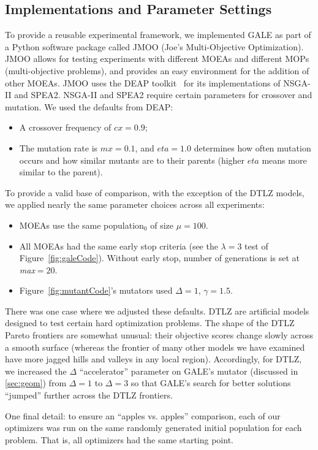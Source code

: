 \documentclass[10pt,journal,compsoc]{IEEEtran}
\newcommand{\bi}{\begin{itemize}}
\newcommand{\ei}{\end{itemize}}
\newcommand{\tion}[1]{\textsection\ref{sec:#1}}
\newcommand{\fig}[1]{Figure~\ref{fig:#1}}
\newenvironment{changed}{\par}{\par}
\begin{document}
\subsection{Implementations and Parameter Settings}\label{sec:expexp}
To provide a reusable experimental framework, we
implemented GALE as part of a Python software
package called JMOO (Joe's Multi-Objective
Optimization).  JMOO allows for
testing experiments with different MOEAs and
different MOPs (multi-objective problems), and
provides an easy environment for the addition of
other MOEAs.  
JMOO uses the DEAP
toolkit~\cite{jmlr12} for its
implementations of  NSGA-II and SPEA2.
NSGA-II and SPEA2 require certain
 parameters for crossover and
mutation. We used the defaults from  DEAP:
\bi
\item A crossover frequency of  $cx=0.9$;
\item The mutation rate is $mx=0.1$, and $eta=1.0$ determines how often
mutation occurs and how similar mutants are to their
parents (higher $eta$ means more similar to the
parent).
\ei

To provide a valid base of comparison, with the exception of the DTLZ models,
we applied nearly
the same parameter choices across all
experiments:
\bi
\item
MOEAs use the same
population$_0$ of size $\mu=100$.
\item All MOEAs had the same early stop criteria (see the
$\lambda=3$ test of \fig{galeCode}).
Without early stop, 
number of generations is set at {\em max}$=20$.
\item
\fig{mutantCode}'s mutators used \mbox{$\Delta=1$}, \mbox{$\gamma=1.5$}.
\ei
\begin{changed}
There was one case where we adjusted these defaults. 
DTLZ are artificial models designed to test certain hard optimization problems.
The shape of the DTLZ Pareto frontiers are somewhat unusual:
their
objective scores change slowly
across a smooth surface (whereas the frontier of
many other models we have examined have more jagged hills and valleys
in any local region). Accordingly, for DTLZ, we increased the
$\Delta$ ``accelerator'' parameter on GALE's mutator
(discussed in \tion{geom}) from $\Delta=1$ to $\Delta=3$
so that  GALE's search for better solutions
``jumped'' further across the DTLZ frontiers.

One final detail: to ensure an ``apples vs. apples'' comparison, 
each of our optimizers was run on the same randomly generated
initial population for each problem. That is, all optimizers had the same starting point.
\end{changed}
\end{document}
